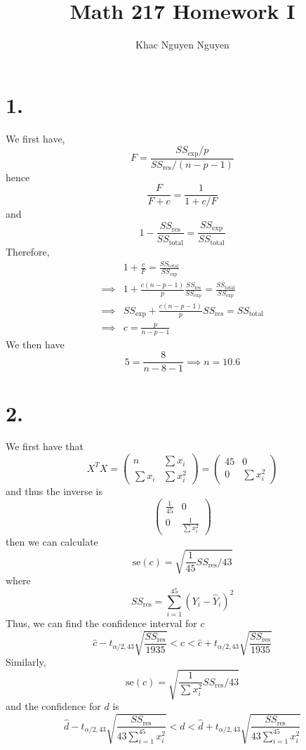 \documentclass[11pt]{article}
\title{\textbf{Math 217 Homework I}}
\author{Khac Nguyen Nguyen}
\date{}
\theoremstyle{mystyle}
\theoremstyle{definition}
\begin{document}
\section*{1.}
We first have, 
\[
  F = \displaystyle\frac{SS_{\exp}/p}{SS_{\text{res}}/(n-p-1)}
\]
hence
\[
  \displaystyle\frac{F}{F+c} = \displaystyle\frac{1}{1 + c/F}
\]
and  
\[
  1 - \displaystyle\frac{SS_{\text{res}}}{SS_{\text{total}}} = \displaystyle\frac{SS_{\exp}}{SS_{\text{total}}}
\]
Therefore,
\begin{align*} 
  &1 + \displaystyle\frac{c}{F} = \frac{SS_\text{total}}{SS_{\exp}}\\
  \implies &1 + \displaystyle\frac{c(n-p-1)}{p} \displaystyle\frac{SS_\text{res}}{SS_{\exp}} = \frac{SS_\text{total}}{SS_{\exp}}\\
  \implies &SS_{\exp}+ \displaystyle\frac{c(n-p-1)}{p} SS_\text{res} = SS_\text{total} \\
  \implies &c = \displaystyle\frac{p}{n-p-1}
\end{align*}
We then have 
\[
  5 = \displaystyle\frac{8}{n-8-1} \implies n = 10.6 
\]
\pagebreak
\section*{2.}
We first have that 
\[
  X^T X = 
  \begin{pmatrix}
    n & \sum x_i \\
    \sum x_i & \sum x_i^2
  \end{pmatrix}
  = 
  \begin{pmatrix}
    45 & 0 \\
    0 & \sum x_i^2
  \end{pmatrix}
\]
and thus the inverse is 
\[
  \begin{pmatrix}
    \displaystyle\frac{1}{45} & 0 \\
    0 & \displaystyle\frac{1}{\sum x_i^2}
  \end{pmatrix}
\]
then we can calculate 
\[
  \text{se}(c) = \sqrt{\displaystyle\frac{1}{45} SS_\text{res} / 43}
\]
where
\[
  SS_\text{res} = \sum_{i=1}^{45} (Y_i - \hat Y_i)^2
\]
Thus, we can find the confidence interval for $c$
\[
  \hat c - t_{\alpha/2, 43} \sqrt{\displaystyle\frac{SS_\text{res}}{1935}} < c < \hat c + t_{\alpha/2, 43} \sqrt{\displaystyle\frac{SS_\text{res}}{1935}}
\]
Similarly, 
\[
  \text{se}(c) = \sqrt{\displaystyle\frac{1}{\sum x_i^2} SS_\text{res} / 43}
\]
and the confidence for $d$ is 
\[
  \hat d - t_{\alpha/2, 43} \sqrt{\displaystyle\frac{SS_\text{res}}{43 \sum_{i=1}^45 x_i^2}} < d < \hat d + t_{\alpha/2, 43} \sqrt{\displaystyle\frac{SS_\text{res}}{43 \sum_{i=1}^45 x_i^2}}
\]
\end{document}
